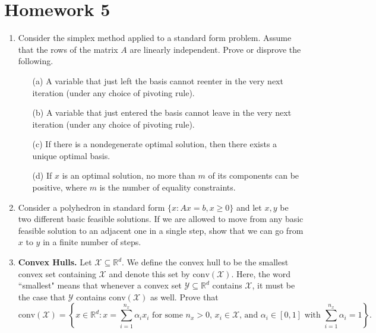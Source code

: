 \documentclass[12pt]{article}
\numberwithin{equation}{section}
\newcommand{\RR}{\mathbb{R}}
\newcommand{\cX}{\mathcal{X}}
\newcommand{\cY}{\mathcal{Y}}
\newcommand{\conv}{\mathrm{conv}}
\theoremstyle{remark}
\begin{document}
\newpage
\section{Homework 5}

\begin{enumerate}
\item     Consider the simplex method applied to a standard form problem. Assume that the rows of the matrix $A$ are linearly independent. Prove or disprove the following.
        \begin{itemize}
            \item[(a)] A variable that just left the basis cannot reenter in the very next iteration (under any choice of pivoting rule).
            \item[(b)] A variable that just entered the basis cannot leave in the very next iteration (under any choice of pivoting rule).
            \item[(c)] If there is a nondegenerate optimal solution, then there exists a unique optimal basis.
            \item[(d)] If $x$ is an optimal solution, no more than $m$ of its components can be positive, where $m$ is the number of equality constraints.
        \end{itemize}

\item\Coffeecup Consider a polyhedron in standard form $\{x \colon Ax=b, x\geq 0\}$ and let $x,y$ be two different basic feasible solutions. If we are allowed to move from any basic feasible solution to an adjacent one in a single step, show that we can go from $x$ to $y$ in a finite number of steps.
\item {\bf Convex Hulls.} {\rm 
Let $\cX \subseteq \RR^d.$ We define the convex hull to be the smallest convex set containing $\cX$ and denote this set by $\conv(\cX)$. Here, the word ``smallest" means that whenever a convex set $\cY \subseteq \RR^d$ contains $\cX$, it must be the case that $\cY$ contains $\conv(\cX)$ as well. Prove that 
$$
\conv(\cX) = \left\{ x \in \RR^d \colon x = \sum_{i=1}^{n_x} \alpha_i x_i \text{ for some $n_x > 0$, $x_i \in \cX$, and $\alpha_i \in [0, 1]$ with } \sum_{i=1}^{n_x} \alpha_i = 1\right\}.
$$
}


\end{enumerate}
\end{document}

